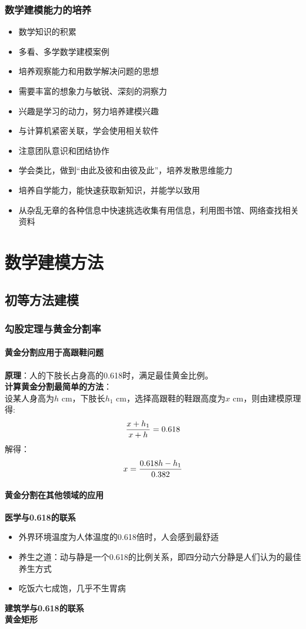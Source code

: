 \documentclass[openany]{progbookcn}
\begin{document}
\section{数学建模能力的培养}
\begin{itemize}
\item 数学知识的积累
\item 多看、多学数学建模案例
\item 培养观察能力和用数学解决问题的思想
\item 需要丰富的想象力与敏锐、深刻的洞察力
\item 兴趣是学习的动力，努力培养建模兴趣
\item 与计算机紧密关联，学会使用相关软件
\item 注意团队意识和团结协作
\item 学会类比，做到“由此及彼和由彼及此”，培养发散思维能力
\item 培养自学能力，能快速获取新知识，并能学以致用
\item 从杂乱无章的各种信息中快速挑选收集有用信息，利用图书馆、网络查找相关资料
\end{itemize}

\part{数学建模方法}

\chapter{初等方法建模}
\section{勾股定理与黄金分割率}
\subsection{黄金分割应用于高跟鞋问题}
\noindent\textbf{原理}：人的下肢长占身高的0.618时，满足最佳黄金比例。\\
\textbf{计算黄金分割最简单的方法}：\\
设某人身高为$h$ cm，下肢长$h_1$ cm，选择高跟鞋的鞋跟高度为$x$ cm，则由建模原理得:
\begin{equation}
{{x+h_1}\over{x+h}}=0.618
\end{equation}
解得：
\begin{equation}
x={{0.618h-h_1}\over 0.382}
\end{equation}
\subsection{黄金分割在其他领域的应用}
\noindent \textbf{医学与0.618的联系}
\begin{itemize}
\item 外界环境温度为人体温度的0.618倍时，人会感到最舒适
\item 养生之道：动与静是一个0.618的比例关系，即四分动六分静是人们认为的最佳养生方式
\item 吃饭六七成饱，几乎不生胃病
\end{itemize}
\noindent \textbf{建筑学与0.618的联系}\\
\noindent \textbf{黄金矩形}
\end{document}
